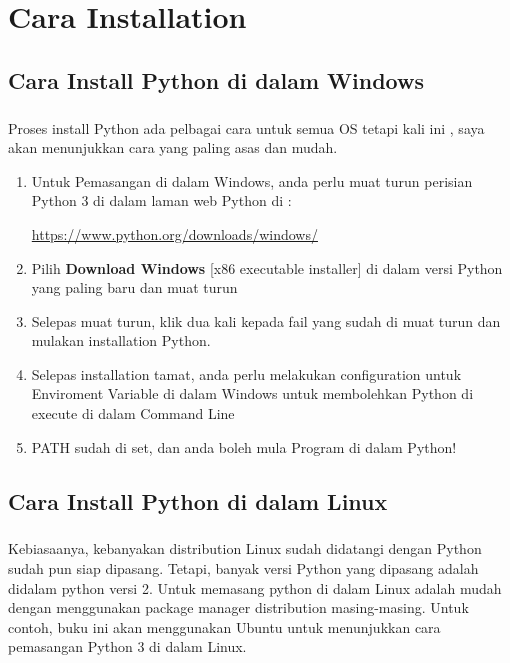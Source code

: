 \chapter{Cara Installation}

\section{Cara Install Python di dalam Windows}


\paragraph{}
Proses install Python ada pelbagai cara untuk semua OS tetapi kali ini , saya akan menunjukkan cara yang paling asas dan mudah.

\begin{enumerate}
	\item  Untuk Pemasangan di dalam Windows, anda perlu muat turun perisian Python 3 di dalam laman web Python di : 

	\url{https://www.python.org/downloads/windows/}

	\item Pilih \textbf{Download Windows} [x86 executable installer] di dalam versi Py\-thon yang paling baru dan muat turun
	\item Selepas muat turun, klik dua kali kepada fail yang sudah di muat turun dan mulakan installation Python.
	\item Selepas installation tamat, anda perlu melakukan configuration untuk Enviroment Variable di dalam Windows untuk membolehkan Python di execute di dalam Command Line
	\item PATH sudah di set, dan anda boleh mula Program di dalam Python!

\end{enumerate}

\section{Cara Install Python di dalam Linux}

\paragraph{}
Kebiasaanya, kebanyakan distribution Linux sudah didatangi dengan Python sudah pun siap dipasang. Tetapi, banyak versi Python yang dipasang adalah didalam python versi 2. Untuk memasang python di dalam Linux adalah mudah dengan menggunakan package manager distribution masing-masing. Untuk contoh, buku ini akan menggunakan Ubuntu untuk menunjukkan cara pemasangan Python 3 di dalam Linux.

